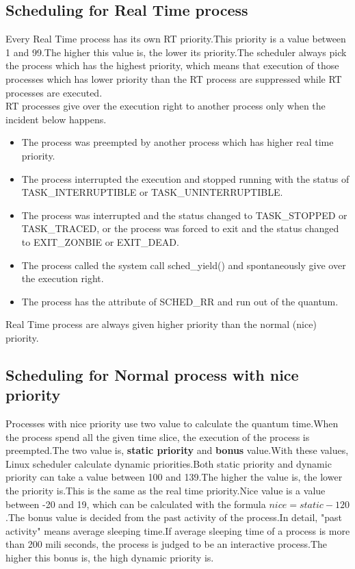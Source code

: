 \documentclass[10pt,a4paper]{ltjsarticle}       %
\begin{document}
\subsection{Scheduling for Real Time process}
Every Real Time process has its own RT priority.This priority is a value between 1 and 99.The higher this value is, the lower its priority.The scheduler always pick the process which has the highest priority, which means that execution of those processes which has lower priority than the RT process are suppressed while RT processes are executed.\\
RT processes give over the execution right to another process only when the incident below happens.
\begin{itemize}
\item The process was preempted by another process which has higher real time priority.
\item The process interrupted the execution and stopped running with the status of TASK\_INTERRUPTIBLE or TASK\_UNINTERRUPTIBLE.
\item The process was interrupted and the status changed to TASK\_STOPPED or TASK\_TRACED, or the process was forced to exit and the status changed to EXIT\_ZONBIE or EXIT\_DEAD.
\item The process called the system call sched\_yield() and spontaneously give over the execution right.
\item The process has the attribute of SCHED\_RR and run out of the quantum.
\end{itemize}
Real Time process are always given higher priority than the normal (nice) priority.
\subsection{Scheduling for Normal process with nice priority}
Processes with nice priority use two value to calculate the quantum time.When the process spend all the given time slice, the execution of the process is preempted.The two value is, {\bf static priority} and {\bf bonus} value.With these values, Linux scheduler calculate dynamic priorities.Both static priority and dynamic priority can take a value between 100 and 139.The higher the value is, the lower the priority is.This is the same as the real time priority.Nice value is a value between -20 and 19, which can be calculated with the formula $nice = static - 120$.The bonus value is decided from the past activity of the process.In detail, "past activity" means average sleeping time.If average sleeping time of a process is more than 200 mili seconds, the process is judged to be an interactive process.The higher this bonus is, the high dynamic priority is.
\end{document}
